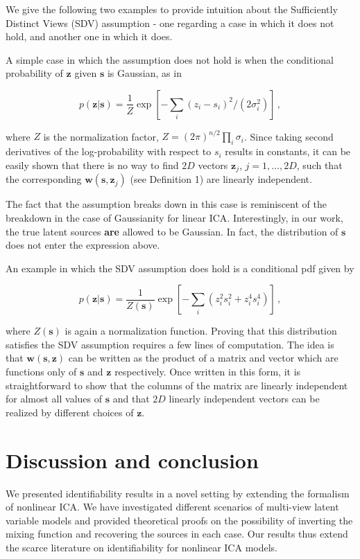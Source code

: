 We give the following two examples to provide intuition about the Sufficiently Distinct Views (SDV) assumption - one regarding a case in which it does not hold, and another one in which it does.


A simple case in which the assumption does not hold is when the conditional probability of $\bm{z}$ given $\bm{s}$ is Gaussian, as in

\begin{equation}
p(\bm{z}|\bm{s}) = \frac{1}{Z} \exp\left[ -\sum_i (z_i - s_i)^2/(2\sigma_i^2) \right]\,, \label{eq:unsatisfied}
\end{equation}

where $Z$ is the normalization factor, $Z = (2\pi)^{n/2}  \prod_i \sigma_i$.
Since taking second derivatives of the log-probability with respect to $s_i$ results in constants,
it can be easily shown that there is no way to find $2D$ vectors $\bm{z}_j$, $j=1, \ldots, 2D$, such that the corresponding $\bm{w}(\bm{s}, \bm{z}_j)$ (see Definition 1) are linearly independent.


The fact that the assumption breaks down in this case is reminiscent of the breakdown in the case of Gaussianity for linear ICA. Interestingly, in our work, the true latent sources \textbf{are} allowed to be Gaussian. In fact, the distribution of $\bm{s}$ does not enter the expression above.


An example in which the SDV assumption does hold is a conditional pdf given by

\begin{equation}
p(\bm{z}|\bm{s}) = \frac{1}{Z(\bm{s})} \exp \left[ - \sum_i (z_i^2  s_i^2 + z_i^4 s_i^4  ) \right]\,, \label{eq:satisfied}
\end{equation}

where $Z(\bm{s})$ is again a normalization function.
Proving that this distribution satisfies the SDV assumption requires a few lines of computation.
The idea is that $\bm{w}(\bm{s}, \bm{z})$ can be written as the product of a matrix and vector which are functions only of $\bm{s}$ and $\bm{z}$ respectively.
Once written in this form, it is straightforward to show that the columns of the matrix are linearly independent for almost all values of $\bm{s}$ and that $2D$ linearly independent vectors can be realized by different choices of $\bm{z}$.


\section{Discussion and conclusion}
\label{sec:on_suffistv}
We presented identifiability results in a novel setting by extending the formalism of nonlinear ICA.
We have investigated different scenarios of multi-view latent variable models and provided theoretical proofs on the possibility of inverting the mixing function and recovering the sources in each case.
Our results thus extend the scarce literature on identifiability for nonlinear ICA models.

